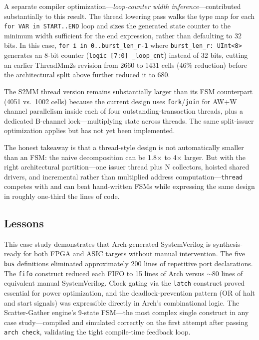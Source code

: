 \documentclass[11pt,twocolumn]{article}
\begin{document}
A separate compiler optimization---\emph{loop-counter width inference}---contributed substantially to this result. The thread lowering pass walks the type map for each \texttt{for VAR in START..END} loop and sizes the generated state counter to the minimum width sufficient for the end expression, rather than defaulting to 32 bits. In this case, \texttt{for i in 0..burst\_len\_r-1} where \texttt{burst\_len\_r: UInt<8>} generates an 8-bit counter (\texttt{logic [7:0] \_loop\_cnt}) instead of 32 bits, cutting an earlier ThreadMm2s revision from 2660 to 1431 cells (46\% reduction) before the architectural split above further reduced it to 680.

The S2MM thread version remains substantially larger than its FSM counterpart (4051 vs.\ 1002 cells) because the current design uses \texttt{fork}/\texttt{join} for AW+W channel parallelism inside each of four outstanding-transaction threads, plus a dedicated B-channel lock---multiplying state across threads. The same split-issuer optimization applies but has not yet been implemented.

The honest takeaway is that a thread-style design is not automatically smaller than an FSM: the naive decomposition can be 1.8$\times$ to 4$\times$ larger. But with the right architectural partition---one issuer thread plus N collectors, hoisted shared drivers, and incremental rather than multiplied address computation---\texttt{thread} competes with and can beat hand-written FSMs while expressing the same design in roughly one-third the lines of code.

\subsection{Lessons}

This case study demonstrates that Arch-generated SystemVerilog is synthesis-ready for both FPGA and ASIC targets without manual intervention. The five \texttt{bus} definitions eliminated approximately 200 lines of repetitive port declarations. The \texttt{fifo} construct reduced each FIFO to 15 lines of Arch versus ${\sim}$80 lines of equivalent manual SystemVerilog. Clock gating via the \texttt{latch} construct proved essential for power optimization, and the deadlock-prevention pattern (OR of halt and start signals) was expressible directly in Arch's combinational logic. The Scatter-Gather engine's 9-state FSM---the most complex single construct in any case study---compiled and simulated correctly on the first attempt after passing \texttt{arch check}, validating the tight compile-time feedback loop.
\end{document}
